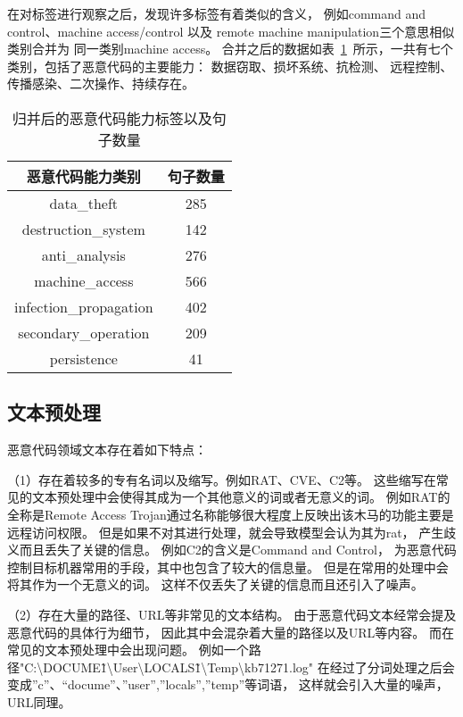 在对标签进行观察之后，发现许多标签有着类似的含义，
例如command and control、machine access/control 
以及 remote machine manipulation三个意思相似类别合并为
同一类别machine access。
合并之后的数据如表~\ref{tab:newcap}~所示，一共有七个类别，包括了恶意代码的主要能力：
数据窃取、损坏系统、抗检测、 远程控制、传播感染、二次操作、持续存在。
\begin{table}[htb]
	\renewcommand{\arraystretch}{1.3}
	\caption{归并后的恶意代码能力标签以及句子数量}
	\label{tab:newcap}
	\vspace{0.5em}\centering\wuhao
	\begin{tabular}{c c}
		\toprule  恶意代码能力类别 & 句子数量  \\
		\midrule[1pt] 
		data\_theft & 285 \\
		destruction\_system & 142 \\
		anti\_analysis & 276 \\
		machine\_access & 566 \\
		infection\_propagation & 402 \\
		secondary\_operation & 209 \\
		persistence & 41 \\
		 \bottomrule[1.5pt] 
	\end{tabular}
\end{table}


\subsection{文本预处理}
恶意代码领域文本存在着如下特点：

（1）存在着较多的专有名词以及缩写。例如RAT、CVE、C2等。
这些缩写在常见的文本预处理中会使得其成为一个其他意义的词或者无意义的词。
例如RAT的全称是Remote Access Trojan通过名称能够很大程度上反映出该木马的功能主要是远程访问权限。
但是如果不对其进行处理，就会导致模型会认为其为rat，
产生歧义而且丢失了关键的信息。
例如C2的含义是Command and Control，
为恶意代码控制目标机器常用的手段，其中也包含了较大的信息量。
但是在常用的处理中会将其作为一个无意义的词。
这样不仅丢失了关键的信息而且还引入了噪声。

（2）存在大量的路径、URL等非常见的文本结构。
由于恶意代码文本经常会提及恶意代码的具体行为细节，
因此其中会混杂着大量的路径以及URL等内容。
而在常见的文本预处理中会出现问题。
例如一个路径"C:\textbackslash DOCUME\~1\textbackslash User\textbackslash LOCALS\~1\textbackslash Temp\textbackslash kb71271.log"
在经过了分词处理之后会变成”c”、“docume”、”user”,”locals”,”temp”等词语，
这样就会引入大量的噪声，URL同理。

